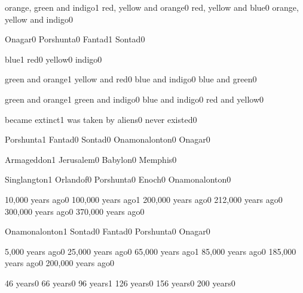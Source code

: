 {orange, green and indigo}{1}
{red, yellow and orange}{0}
{red, yellow and blue}{0}
{orange, yellow and indigo}{0}
\qstop

{Onagar}{0}
{Porshunta}{0}
{Fantad}{1}
{Sontad}{0}
\qstop

{blue}{1}
{red}{0}
{yellow}{0}
{indigo}{0}
\qstop

{green and orange}{1}
{yellow and red}{0}
{blue and indigo}{0}
{blue and green}{0}
\qstop

{green and orange}{1}
{green and indigo}{0}
{blue and indigo}{0}
{red and yellow}{0}
\qstop


{became extinct}{1}
{was taken by aliens}{0}
{never existed}{0}
\qstop

{Porshunta}{1}
{Fantad}{0}
{Sontad}{0}
{Onamonalonton}{0}
{Onagar}{0}
\qstop

{Armageddon}{1}
{Jerusalem}{0}
{Babylon}{0}
{Memphis}{0}
\qstop

{Singlangton}{1}
{Orlandof}{0}
{Porshunta}{0}
{Enoch}{0}
{Onamonalonton}{0}
\qstop

{10,000 years ago}{0}
{100,000 years ago}{1}
{200,000 years ago}{0}
{212,000 years ago}{0}
{300,000 years ago}{0}
{370,000 years ago}{0}
\qstop

{Onamonalonton}{1}
{Sontad}{0}
{Fantad}{0}
{Porshunta}{0}
{Onagar}{0}
\qstop

{5,000 years ago}{0}
{25,000 years ago}{0}
{65,000 years ago}{1}
{85,000 years ago}{0}
{185,000 years ago}{0}
{200,000 years ago}{0}
\qstop

{46 years}{0}
{66 years}{0}
{96 years}{1}
{126 years}{0}
{156 years}{0}
{200 years}{0}
\qstop

